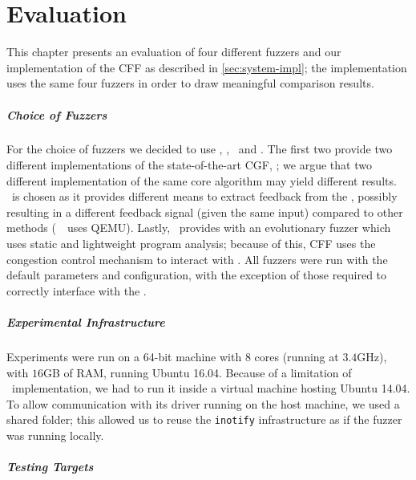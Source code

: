 \chapter{Evaluation}
\label{chap:evaluation}


This chapter presents an evaluation of four different fuzzers and our
implementation of the \acf{CFF} as described in \autoref{sec:system-impl}; the
implementation uses the same four fuzzers in order to draw meaningful comparison
results.

\paragraph{Choice of Fuzzers}

For the choice of fuzzers we decided to use \aflfast, \fairfuzz, \honggfuzz\
and \vuzzer. The first two provide two different implementations of the
state-of-the-art \ac{CGF}, \afl; we argue that two different implementation of
the same core algorithm may yield different results. \honggfuzz\ is chosen as
it provides different means to extract feedback from the \sut, possibly
resulting in a different feedback signal (given the same input) compared to
other methods (\eg\ \afl\ uses QEMU). Lastly, \vuzzer\ provides with an
evolutionary fuzzer which uses static and lightweight program analysis; because
of this, \ac{CFF} uses the congestion control mechanism to interact with
\vuzzer. All fuzzers were run with the default parameters and configuration,
with the exception of those required to correctly interface with the \sut.

\paragraph{Experimental Infrastructure}

Experiments were run on a 64-bit machine with $8$ cores (running at $3.4$GHz),
with $16$GB of RAM, running Ubuntu 16.04. Because of a limitation of \vuzzer\
implementation, we had to run it inside a virtual machine hosting Ubuntu 14.04.
To allow communication with its driver running on the host machine, we used a
shared folder; this allowed us to reuse the \texttt{inotify} infrastructure as
if the fuzzer was running locally.

\paragraph{Testing Targets}

